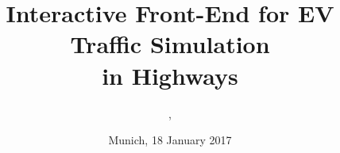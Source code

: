 %
% 
% 
%







\newcommand{\Datum}{\today}

\renewcommand{\PraesentationFusszeileZusatz}{\PersonNameA, \PersonNameB\;| Interactive Front-End for
EV Traffic Simulation in Highways}

\title{Interactive Front-End for EV Traffic Simulation \\ \vspace{5mm} in Highways}
\author{\PersonNameA, \PersonNameB}
\institute[]{\UniversitaetName \\ \FakultaetName \\ \LehrstuhlName}
\date[\Datum]{Munich, 18 January 2017}
\subject{Interactive Front-End for EV Traffic Simulation in Highways}




\PraesentationMasterKopfzeileDreizeiler

\PraesentationTitelseite







